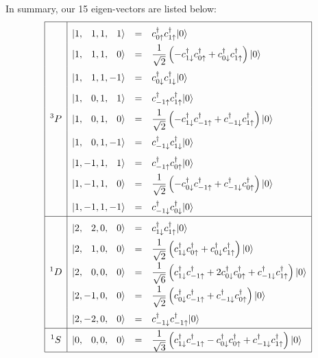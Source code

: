 In summary, our 15 eigen-vectors are listed below:
\begin{equation*}
\renewcommand\arraystretch{1.8}
\begin{array}{|>{\displaystyle}c|>{\displaystyle}c >{\displaystyle}c >{\displaystyle}l|}
\hline
& |1,\phantom{-}1,1,\phantom{-}1\rangle & = & c_{0\uparrow}^\dagger c_{1\uparrow}^\dagger |0\rangle \\ 
& |1,\phantom{-}1,1,\phantom{-}0\rangle & = & \frac{1}{\sqrt{2}} \left( -c_{1\downarrow}^\dagger c_{0\uparrow}^\dagger +c_{0\downarrow}^\dagger c_{1\uparrow}^\dagger \right)|0\rangle \\ 
& |1,\phantom{-}1,1,-1\rangle & = & c_{0\downarrow}^\dagger c_{1\downarrow}^\dagger |0\rangle \\ 
& |1,\phantom{-}0,1,\phantom{-}1\rangle & = & c_{-1\uparrow}^\dagger c_{1\uparrow}^\dagger |0\rangle \\ 
^{3}P & |1,\phantom{-}0,1,\phantom{-}0\rangle & = & \frac{1}{\sqrt{2}} \left( -c_{1\downarrow}^\dagger c_{-1\uparrow}^\dagger +c_{-1\downarrow}^\dagger c_{1\uparrow}^\dagger \right)|0\rangle \\ 
& |1,\phantom{-}0,1,-1\rangle & = & c_{-1\downarrow}^\dagger c_{1\downarrow}^\dagger |0\rangle \\ 
& |1,-1,1,\phantom{-}1\rangle & = & c_{-1\uparrow}^\dagger c_{0\uparrow}^\dagger |0\rangle \\ 
& |1,-1,1,\phantom{-}0\rangle & = & \frac{1}{\sqrt{2}} \left( -c_{0\downarrow}^\dagger c_{-1\uparrow}^\dagger +c_{-1\downarrow}^\dagger c_{0\uparrow}^\dagger \right)|0\rangle \\ 
& |1,-1,1,-1\rangle & = & c_{-1\downarrow}^\dagger c_{0\downarrow}^\dagger |0\rangle \\
\hline
& |2,\phantom{-}2,0,\phantom{-}0\rangle & = & c_{1\downarrow}^\dagger c_{1\uparrow}^\dagger |0\rangle \\ 
& |2,\phantom{-}1,0,\phantom{-}0\rangle & = & \frac{1}{\sqrt{2}} \left( c_{1\downarrow}^\dagger c_{0\uparrow}^\dagger +c_{0\downarrow}^\dagger c_{1\uparrow}^\dagger \right)|0\rangle \\ 
^{1}D & |2,\phantom{-}0,0,\phantom{-}0\rangle & = & \frac{1}{\sqrt{6}} \left( c_{1\downarrow}^\dagger c_{-1\uparrow}^\dagger +2c_{0\downarrow}^\dagger c_{0\uparrow}^\dagger +c_{-1\downarrow}^\dagger c_{1\uparrow}^\dagger \right)|0\rangle \\ 
& |2,-1,0,\phantom{-}0\rangle & = & \frac{1}{\sqrt{2}} \left( c_{0\downarrow}^\dagger c_{-1\uparrow}^\dagger +c_{-1\downarrow}^\dagger c_{0\uparrow}^\dagger \right)|0\rangle \\ 
& |2,-2,0,\phantom{-}0\rangle & = & c_{-1\downarrow}^\dagger c_{-1\uparrow}^\dagger |0\rangle \\ 
\hline 
^{1}S & |0,\phantom{-}0,0,\phantom{-}0\rangle & = & \frac{1}{\sqrt{3}} \left( c_{1\downarrow}^\dagger c_{-1\uparrow}^\dagger -c_{0\downarrow}^\dagger c_{0\uparrow}^\dagger +c_{-1\downarrow}^\dagger c_{1\uparrow}^\dagger \right)|0\rangle \\
\hline
\end{array}
\end{equation*}

